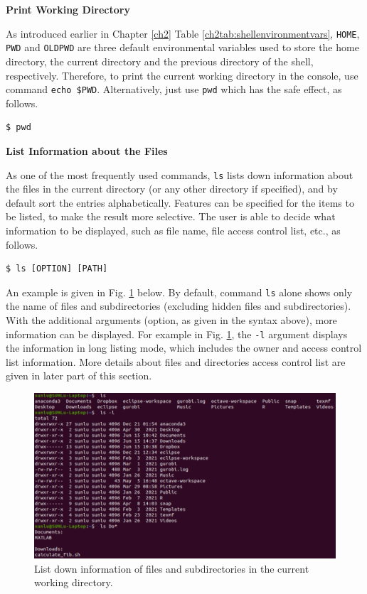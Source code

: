 \textbf{Print Working Directory}

As introduced earlier in Chapter \ref{ch2} Table \ref{ch2tab:shellenvironmentvars}, \verb|HOME|, \verb|PWD| and \verb|OLDPWD| are three default environmental variables used to store the home directory, the current directory and the previous directory of the shell, respectively. Therefore, to print the current working directory in the console, use command \verb|echo $PWD|. Alternatively, just use \verb|pwd| which has the safe effect, as follows.

\begin{lstlisting}
$ pwd
\end{lstlisting}

\textbf{List Information about the Files}

As one of the most frequently used commands, \verb|ls| lists down information about the files in the current directory (or any other directory if specified), and by default sort the entries alphabetically. Features can be specified for the items to be listed, to make the result more selective. The user is able to decide what information to be displayed, such as file name, file access control list, etc., as follows.
\begin{lstlisting}
$ ls [OPTION] [PATH]
\end{lstlisting}

An example is given in Fig. \ref{ch4fig:lscommandexample} below. By default, command \verb|ls| alone shows only the name of files and subdirectories (excluding hidden files and subdirectories). With the additional arguments (option, as given in the syntax above), more information can be displayed. For example in Fig. \ref{ch4fig:lscommandexample}, the \verb|-l| argument displays the information in long listing mode, which includes the owner and access control list information. More details about files and directories access control list are given in later part of this section.

\begin{figure}
	\centering
	\includegraphics[width=350pt]{chapters/chapter4/figures/ls_command_example.png}
	\caption{List down information of files and subdirectories in the current working directory.} \label{ch4fig:lscommandexample}
\end{figure}

